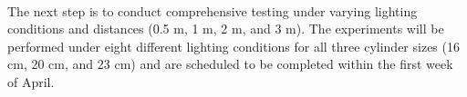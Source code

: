 \paragraph*{}
The next step is to conduct comprehensive testing under varying lighting conditions and distances (0.5 m, 1 m, 2 m, and 3 m). The experiments will be performed under eight different lighting conditions for all three cylinder sizes (16 cm, 20 cm, and 23 cm) and are scheduled to be completed within the first week of April.
